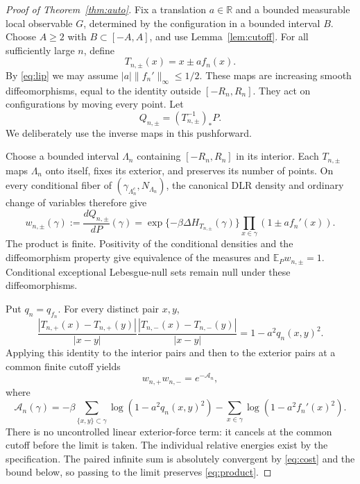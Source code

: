 \documentclass[11pt,reqno]{amsart}
\numberwithin{equation}{section}
\theoremstyle{definition}
\theoremstyle{remark}
\newcommand{\R}{\mathbb R}
\newcommand{\E}{\mathbb E}
\newcommand{\1}{\mathbf1}
\begin{document}
\begin{proof}[Proof of Theorem~\ref{thm:auto}]
Fix a translation $a\in\R$ and a bounded measurable local observable
$G$, determined by the configuration in a bounded interval $B$.
Choose $A\ge2$ with $B\subset[-A,A]$, and use Lemma~\ref{lem:cutoff}.
For all sufficiently large $n$, define
\[
T_{n,\pm}(x)=x\pm af_n(x).
\]
By \eqref{eq:lip} we may assume
$|a|\|f_n'\|_\infty\le1/2$. These maps are increasing smooth
diffeomorphisms, equal to the identity outside $[-R_n,R_n]$.
They act on configurations by moving every point.
Let
\[
Q_{n,\pm}=(T_{n,\pm}^{-1})_*P.
\]
We deliberately use the inverse maps in this pushforward.

Choose a bounded interval $\Lambda_n$ containing $[-R_n,R_n]$ in
its interior. Each $T_{n,\pm}$ maps $\Lambda_n$ onto itself, fixes
its exterior, and preserves its number of points. On every conditional
fiber of $(\gamma_{\Lambda_n^c},N_{\Lambda_n})$, the canonical DLR
density and ordinary change of variables therefore give
\begin{equation}\label{eq:RN}
w_{n,\pm}(\gamma):=\frac{dQ_{n,\pm}}{dP}(\gamma)
=\exp\{-\beta\Delta H_{T_{n,\pm}}(\gamma)\}
 \prod_{x\in\gamma}(1\pm af_n'(x)).
\end{equation}
The product is finite. Positivity of the conditional densities and
the diffeomorphism property give equivalence of the measures and
$\E_Pw_{n,\pm}=1$. Conditional exceptional Lebesgue-null sets remain
null under these diffeomorphisms.

Put $q_n=q_{f_n}$. For every distinct pair $x,y$,
\[
\frac{|T_{n,+}(x)-T_{n,+}(y)|}{|x-y|}
\frac{|T_{n,-}(x)-T_{n,-}(y)|}{|x-y|}
=1-a^2q_n(x,y)^2.
\]
Applying this identity to the interior pairs and then to the exterior
pairs at a common finite cutoff yields
\begin{equation}\label{eq:product}
w_{n,+}w_{n,-}=e^{-\mathcal A_n},
\end{equation}
where
\begin{equation}\label{eq:An}
\mathcal A_n(\gamma)=
-\beta\sum_{\{x,y\}\subset\gamma}\log(1-a^2q_n(x,y)^2)
-\sum_{x\in\gamma}\log(1-a^2f_n'(x)^2).
\end{equation}
There is no uncontrolled linear exterior-force term: it cancels at
the common cutoff before the limit is taken. The individual relative
energies exist by the specification. The paired infinite sum is
absolutely convergent by \eqref{eq:cost} and the bound below, so passing
to the limit preserves \eqref{eq:product}.


\end{proof}
\end{document}

